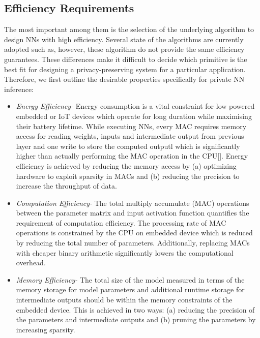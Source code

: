 \subsection{Efficiency Requirements}

The most important among them is the selection of the underlying algorithm to design NNs with high efficiency.
Several state of the algorithms are currently adopted such as, however, these algorithm do not provide the same efficiency guarantees.
These differences make it difficult to decide which primitive is the best fit for designing a privacy-preserving system for a particular application.
Therefore, we first outline the desirable properties specifically for private NN inference:

\begin{itemize}[leftmargin=*]
\item {\em Energy Efficiency-} Energy consumption is a vital constraint for low powered embedded or IoT devices which operate for long duration while maximising their battery lifetime.
While executing NNs, every MAC requires memory access for reading weights, inputs and intermediate output from previous layer and one write to store the computed outputl which is significantly higher than actually performing the MAC operation in the CPU[].
Energy efficiency is achieved by reducing the memory access by (a) optimizing hardware to exploit sparsity in MACs and (b) reducing the precision to increase the throughput of data.

\item {\em Computation Efficiency-} The total multiply accumulate (MAC) operations between the parameter matrix and input activation function quantifies the requirement of computation efficiency.
The processing rate of MAC operations is constrained by the CPU on embedded device which is reduced by reducing the total number of parameters.
Additionally, replacing MACs with cheaper binary arithmetic significantly lowers the computational overhead.

\item {\em Memory Efficiency-} The total size of the model measured in terms of the memory storage for model parameters and additional runtime storage for intermediate outputs should be within the memory constraints of the embedded device.
This is achieved in two ways: (a) reducing the precision of the parameters and intermediate outputs and (b) pruning the parameters by increasing sparsity.
\end{itemize}



